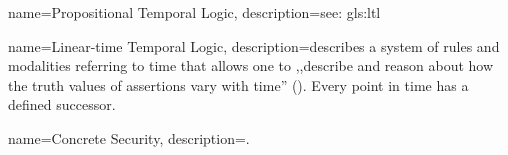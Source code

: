 {
    name={Propositional Temporal Logic},
    description={see: \gls{gls:ltl}}
}

{
    name={Linear-time Temporal Logic},
    description={describes a system of rules and modalities referring to time that allows one to ,,describe and reason about how the truth values of assertions vary
with time'' (\cite{emerson1990temporal}). Every point in time has a defined successor.}
}

{
    name={Concrete Security},
    description={.}
}
